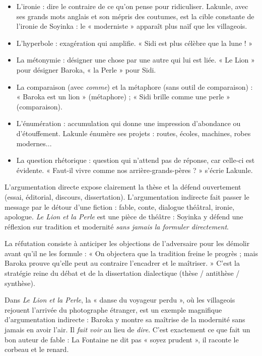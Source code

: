 \documentclass[11pt]{article}
\newcommand{\cle}[1]{{\popxbold\color{popdark}#1}}
\newcounter{popsec}
\newcounter{popsub}
\newcommand{\courssub}[1]{%
  \stepcounter{popsub}%
  \par\vspace{9pt}\noindent{\popxbold\fontsize{11.5}{13}\selectfont\color{popink}{\color{poporange}\thepopsec.\thepopsub}\hspace{6pt}#1}\par\nopagebreak\vspace{4pt}
}
\begin{document}
\begin{itemize}
\item L'\cle{ironie} : dire le contraire de ce qu'on pense pour ridiculiser. Lakunle, avec ses grands mots anglais et son mépris des coutumes, est la cible constante de l'ironie de Soyinka : le « moderniste » apparaît plus naïf que les villageois.
\item L'\cle{hyperbole} : exagération qui amplifie. « Sidi est plus célèbre que la lune ! »
\item La \cle{métonymie} : désigner une chose par une autre qui lui est liée. « Le Lion » pour désigner Baroka, « la Perle » pour Sidi.
\item La \cle{comparaison} (avec \emph{comme}) et la \cle{métaphore} (sans outil de comparaison) : « Baroka est un lion » (métaphore) ; « Sidi brille comme une perle » (comparaison).
\item L'\cle{énumération} : accumulation qui donne une impression d'abondance ou d'étouffement. Lakunle énumère ses projets : routes, écoles, machines, robes modernes...
\item La \cle{question rhétorique} : question qui n'attend pas de réponse, car celle-ci est évidente. « Faut-il vivre comme nos arrière-grands-pères ? » s'écrie Lakunle.
\end{itemize}

\courssub{Les stratégies argumentatives}

\begin{definition}
L'argumentation \cle{directe} expose clairement la thèse et la défend ouvertement (essai, éditorial, discours, dissertation). L'argumentation \cle{indirecte} fait passer le message par le détour d'une fiction : fable, conte, dialogue théâtral, ironie, apologue. \emph{Le Lion et la Perle} est une pièce de théâtre : Soyinka y défend une réflexion sur tradition et modernité \emph{sans jamais la formuler directement}.
\end{definition}

La \cle{réfutation} consiste à anticiper les objections de l'adversaire pour les démolir avant qu'il ne les formule : « On objectera que la tradition freine le progrès ; mais Baroka prouve qu'elle peut au contraire l'encadrer et le maîtriser. » C'est la stratégie reine du débat et de la dissertation dialectique (thèse / antithèse / synthèse).

\begin{savaistu}
Dans \emph{Le Lion et la Perle}, la « danse du voyageur perdu », où les villageois rejouent l'arrivée du photographe étranger, est un exemple magnifique d'argumentation indirecte : Baroka y montre sa maîtrise de la modernité sans jamais en avoir l'air. Il \emph{fait voir} au lieu de \emph{dire}. C'est exactement ce que fait un bon auteur de fable : La Fontaine ne dit pas « soyez prudent », il raconte le corbeau et le renard.
\end{savaistu}
\end{document}
